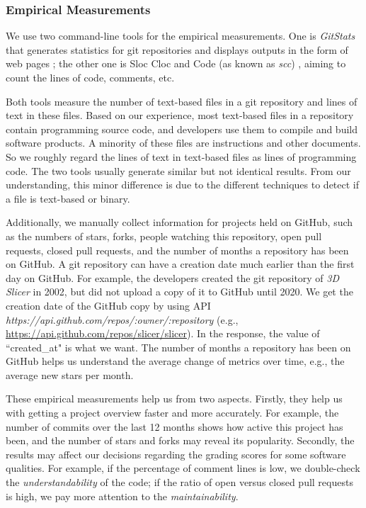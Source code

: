 \documentclass[3p, 12pt,authoryear]{elsarticle}
\begin{document}
\subsubsection{Empirical Measurements} \label{sec_empirical_measurements}

We use two command-line tools for the empirical measurements. One is
\textit{GitStats} that generates statistics for git repositories and displays
outputs in the form of web pages \citep{Gieniusz2019}; the other one is Sloc Cloc
and Code (as known as \textit{scc}) \citep{Boyter2021}, aiming to count the lines
of code, comments, etc.

Both tools measure the number of text-based files in a git repository and lines
of text in these files. Based on our experience, most text-based files in a
repository contain programming source code, and developers use them to compile
and build software products. A minority of these files are instructions and
other documents. So we roughly regard the lines of text in text-based files as
lines of programming code. The two tools usually generate similar but not
identical results. From our understanding, this minor difference is due to the
different techniques to detect if a file is text-based or binary.

Additionally, we manually collect information for projects held on GitHub, such
as the numbers of stars, forks, people watching this repository, open pull
requests, closed pull requests, and the number of months a repository has been
on GitHub. A git repository can have a creation date much earlier than the first
day on GitHub. For example, the developers created the git repository of
\textit{3D Slicer} in 2002, but did not upload a copy of it to GitHub until
2020. We get the creation date of the GitHub copy by using API
\textit{https://api.github.com/repos/{:owner}/{:repository}} (e.g.,
\hyperlink{https://api.github.com/repos/slicer/slicer}{https://api.github.com/repos/slicer/slicer}).
In the response, the value of ``created\_at" is what we want. The number of
months a repository has been on GitHub helps us understand the average change of
metrics over time, e.g., the average new stars per month. 

These empirical measurements help us from two aspects. Firstly, they help us
with getting a project overview faster and more accurately. For example, the
number of commits over the last 12 months shows how active this project has
been, and the number of stars and forks may reveal its popularity. Secondly, the
results may affect our decisions regarding the grading scores for some software
qualities. For example, if the percentage of comment lines is low, we
double-check the \textit{understandability} of the code; if the ratio of open
versus closed pull requests is high, we pay more attention to the
\textit{maintainability}.
\end{document}
